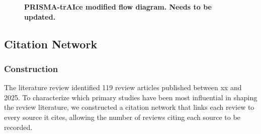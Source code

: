 \documentclass[11pt,a4paper]{article}
\begin{document}
\begin{figure}[htbp]
{\begin{tikzpicture}
\end{tikzpicture}
}%
\caption{\textbf{PRISMA-trAIce modified flow diagram. Needs to be updated.}
}
\label{fig:prisma}
\end{figure}



\subsection{Citation Network}
\label{sec:citation}

\subsubsection{Construction}
\label{sec:citation-methods}
The literature review identified 119 review articles published between xx and 2025. To characterize which primary studies have been most influential in shaping the review literature, we constructed a citation network that links each review to every source it cites, allowing the number of reviews citing each source to be recorded.
\end{document}

